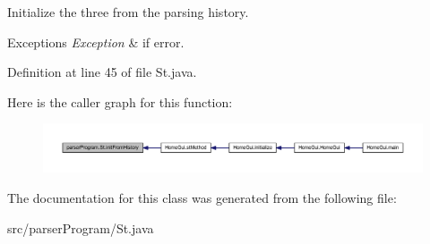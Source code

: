 Initialize the three from the parsing history. 


\begin{DoxyExceptions}{Exceptions}
{\em Exception} & if error. \\
\hline
\end{DoxyExceptions}


Definition at line 45 of file St.\-java.



Here is the caller graph for this function\-:\nopagebreak
\begin{figure}[H]
\begin{center}
\leavevmode
\includegraphics[width=350pt]{classparser_program_1_1_st_afe794d3e531e9bd6c21dbb1f6398bcd0_icgraph}
\end{center}
\end{figure}




The documentation for this class was generated from the following file\-:\begin{DoxyCompactItemize}
\item 
src/parser\-Program/St.\-java\end{DoxyCompactItemize}
